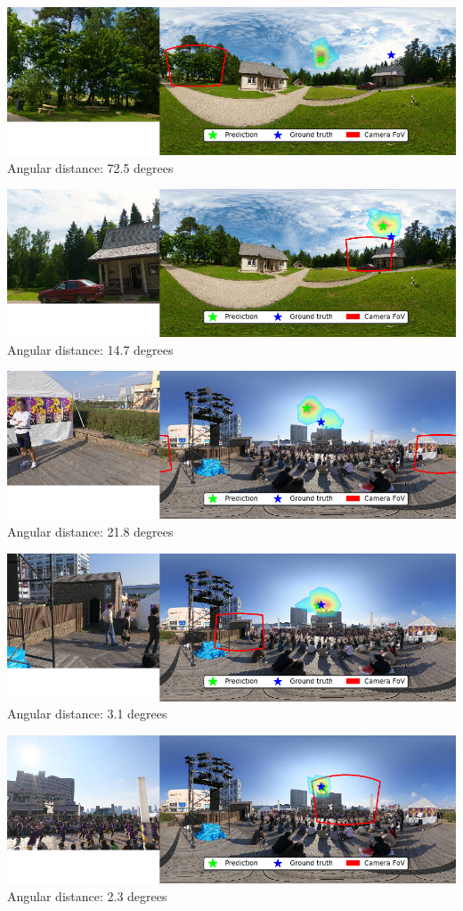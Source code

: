 \begin{multicols}{2}
\includegraphics[width=\mywidth]{pano_aazdyyemiqnyfe.jpg}\\
Angular distance: 72.5 degrees

\includegraphics[width=\mywidth]{pano_aazdyyemiqnyfe_002.jpg}\\
Angular distance: 14.7 degrees

\includegraphics[width=\mywidth]{pano_abapzyetpqwuls_002.jpg}\\
Angular distance: 21.8 degrees

\includegraphics[width=\mywidth]{pano_abapzyetpqwuls_003.jpg}\\
Angular distance: 3.1 degrees

\includegraphics[width=\mywidth]{pano_abapzyetpqwuls_006.jpg}\\
Angular distance: 2.3 degrees

\end{multicols}

